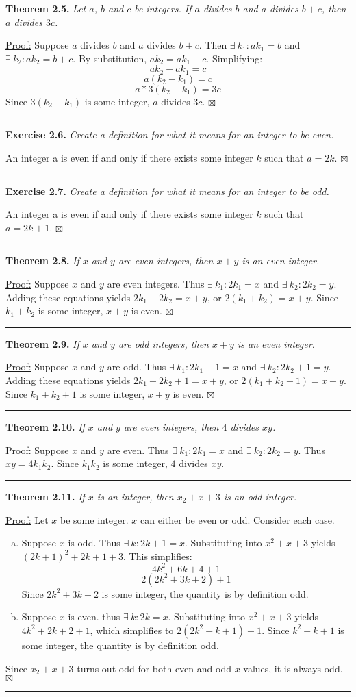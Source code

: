 \documentclass[a4paper,12pt]{article}
\newcommand{\entry}[3]
{
   \noindent\textbf{#1.}
   \emph{#2}
   \bigskip

   \noindent#3
   \bigskip
   \hrule
   \vspace{24pt}
}
\newcommand{\sig}{$\boxtimes$}
\begin{document}
\entry{Theorem 2.5}
{Let $a$, $b$ and $c$ be integers. If $a$ divides $b$ and $a$ divides $b + c$, then $a$ divides $3c$.}
{
\underline{Proof:} Suppose $a$ divides $b$ and $a$ divides $b + c$. Then $\exists~k_1 : ak_1 = b$ and $\exists~k_2 : ak_2 = b + c$. By substitution, $ak_2 = ak_1 + c$. Simplifying: \[ ak_2 - ak_1 = c \] \[ a(k_2 - k_1) = c \] \[ a * 3(k_2 - k_1) = 3c \]
Since $3(k_2 - k_1)$ is some integer, $a$ divides $3c$. \sig
}



\entry{Exercise 2.6}
{Create a definition for what it means for an integer to be even.}
{An integer a is even if and only if there exists some integer $k$ such that $a = 2k$. \sig}



\entry{Exercise 2.7}
{Create a definition for what it means for an integer to be odd.}
{An integer a is even if and only if there exists some integer $k$ such that $a = 2k + 1$. \sig}



\entry{Theorem 2.8}
{If $x$ and $y$ are even integers, then $x + y$ is an even integer.}
{
\underline{Proof:} Suppose $x$ and $y$ are even integers. Thus $\exists~k_1 : 2k_1 = x$ and $\exists~k_2 : 2k_2 = y$. Adding these equations yields $2k_1 + 2k_2 = x + y$, or $2(k_1 + k_2) = x + y$. Since $k_1 + k_2$ is some integer, $x + y$ is even. \sig
}



\entry{Theorem 2.9}
{If $x$ and $y$ are odd integers, then $x + y$ is an even integer.}
{
\underline{Proof:} Suppose $x$ and $y$ are odd. Thus $\exists~k_1 : 2k_1 + 1 = x$ and $\exists~k_2 : 2k_2 + 1 = y$. Adding these equations yields $2k_1 + 2k_2 + 1 = x + y$, or $2(k_1 + k_2 + 1) = x + y$. Since $k_1 + k_2 + 1$ is some integer, $x + y$ is even. \sig
}



\entry{Theorem 2.10}
{If $x$ and $y$ are even integers, then $4$ divides $xy$.}
{
\underline{Proof:} Suppose $x$ and $y$ are even. Thus $\exists~k_1 : 2k_1 = x$ and $\exists~k_2 : 2k_2 = y$. Thus $xy = 4k_{1}k_2$. Since $k_{1}k_2$ is some integer, $4$ divides $xy$.
}



\entry{Theorem 2.11}
{If $x$ is an integer, then $x_2 + x + 3$ is an odd integer.}
{
\underline{Proof:} Let $x$ be some integer. $x$ can either be even or odd. Consider each case.
\begin{enumerate}[(a)]
\item
Suppose $x$ is odd. Thus $\exists~k : 2k + 1 = x$. Substituting into $x^2 + x + 3$ yields $(2k + 1)^2 + 2k + 1 + 3$. This simplifies: \[ 4k^2 + 6k + 4 + 1 \] \[ 2(2k^2 + 3k + 2) + 1 \]
Since $2k^2 + 3k + 2$ is some integer, the quantity is by definition odd.
\item
Suppose $x$ is even. thus $\exists~k : 2k = x$. Substituting into $x^2 + x + 3$ yields $4k^2 + 2k + 2 + 1$, which simplifies to $2(2k^2 + k + 1) + 1$. Since $k^2 + k + 1$ is some integer, the quantity is by definition odd.
\end{enumerate}
Since $x_2 + x + 3$ turns out odd for both even and odd $x$ values, it is always odd. \sig
}
\end{document}
